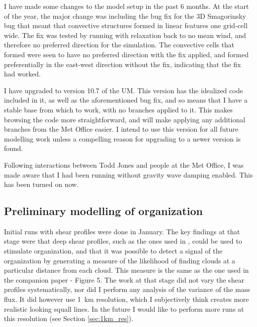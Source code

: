 \documentclass[11pt,a4paper]{article}
\newcommand\todo[1]{\textbf{TODO: #1}}
\begin{document}
I have made some changes to the model setup in the past 6 months. At the start of the year, the major change was including the bug fix for the 3D Smagorinsky bug that meant that convective structures formed in linear features one grid-cell wide. The fix was tested by running with relaxation back to no mean wind, and therefore no preferred direction for the simulation. The convective cells that formed were seen to have no preferred direction with the fix applied, and formed preferentially in the east-west direction without the fix, indicating that the fix had worked.

I have upgraded to version 10.7 of the UM. This version has the idealized code included in it, as well as the aforementioned bug fix, and so means that I have a stable base from which to work, with no branches applied to it. This makes browsing the code more straightforward, and will make applying any additional branches from the Met Office easier. I intend to use this version for all future modelling work unless a compelling reason for upgrading to a newer version is found.

Following interactions between Todd Jones and people at the Met Office, I was made aware that I had been running without gravity wave damping enabled. This has been turned on now.



\subsection{Preliminary modelling of organization}
\label{sec:prelim_modelling}

Initial runs with shear profiles were done in January. The key findings at that stage were that deep shear profiles, such as the ones used in \cite{cohen2006fluctuations}, could be used to stimulate organization, and that it was possible to detect a signal of the organization by generating a measure of the likelihood of finding clouds at a particular distance from each cloud. This measure is the same as the one used in the companion paper \cite{muetz2017effects} - Figure 5. The work at that stage did not vary the shear profiles systematically, nor did I perform any analysis of the variance of the mass flux. It did however use \SI{1}{km} resolution, which I subjectively think creates more realistic looking squall lines. In the future I would like to perform more runs at this resolution (see Section \ref{sec:1km_res}).
\end{document}
